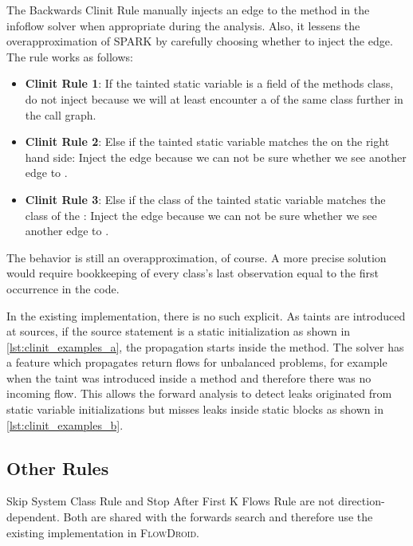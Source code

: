 \documentclass[../draft.tex]{subfiles}
\begin{document}
    The Backwards Clinit Rule manually injects an edge to the  method in the infoflow solver when appropriate during the analysis. Also, it lessens the overapproximation of SPARK by carefully choosing whether to inject the edge. The rule works as follows:
    \begin{itemize}
        \item \textbf{Clinit Rule 1}: If the tainted static variable is a field of the methods class, do not inject because we will at least encounter a  of the same class further in the call graph.
        \item \textbf{Clinit Rule 2}: Else if the tainted static variable matches the  on the right hand side: Inject the edge because we can not be sure whether we see another edge to .
        \item \textbf{Clinit Rule 3}: Else if the class of the tainted static variable matches the class of the : Inject the edge because we can not be sure whether we see another edge to .
    \end{itemize}
    The behavior is still an overapproximation, of course. A more precise solution would require bookkeeping of every class's last observation equal to the first occurrence in the code. 

    In the existing implementation, there is no such explicit. As taints are introduced at sources, if the source statement is a static initialization as shown in \autoref{lst:clinit_examples_a}, the propagation starts inside the  method. The solver has a  feature which propagates return flows for unbalanced problems, for example when the taint was introduced inside a method and therefore there was no incoming flow. This allows the forward analysis to detect leaks originated from static variable initializations but misses leaks inside static blocks as shown in \autoref{lst:clinit_examples_b}.

    \subsection{Other Rules}
    Skip System Class Rule and Stop After First K Flows Rule are not direction-dependent. Both are shared with the forwards search and therefore use the existing implementation in \textsc{FlowDroid}.
    
\end{document}

